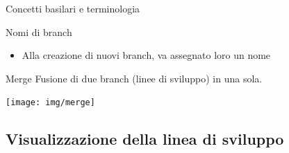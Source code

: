 \documentclass[xcolor=dvipsnames,presentation]{beamer}
\begin{document}
\begin{frame}[allowframebreaks]{Concetti basilari e terminologia}
\begin{block}{Nomi di branch}
\begin{itemize}
\begin{itemize}
                \item Il nome di default è settabile con
                \begin{itemize}
                    \item \texttt{git config --global init.defaultBranch <BRANCH-NAME>}
                \end{itemize}
            \end{itemize}
            \item Alla creazione di nuovi branch, va assegnato loro un nome
        \end{itemize}
    \end{block}
    \begin{block}{Merge}
        Fusione di due branch (linee di sviluppo) in una sola.
        \begin{center}
            \texttt{[image: img/merge]}
        \end{center}
    \end{block}
\end{frame}

\subsection{Visualizzazione della linea di sviluppo}
\end{document}
